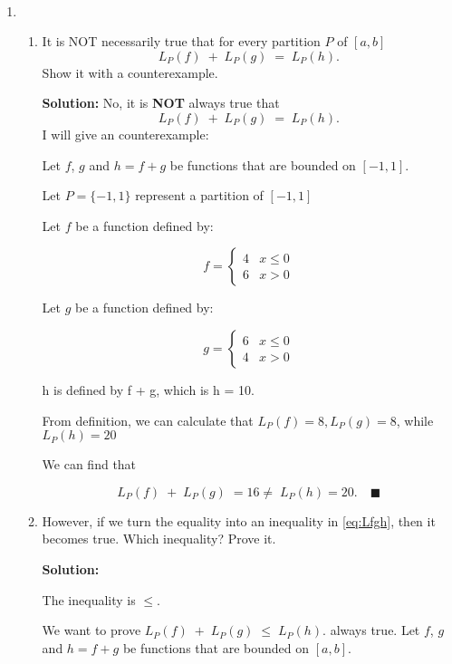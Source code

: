 \documentclass[12pt]{exam}
\begin{document}
\


\begin{enumerate}

\item  \begin{enumerate}
	\item It is NOT necessarily true that for every partition $P$ of $[a,b]$
		\begin{equation} \label{eq:Lfgh}
			L_{P}(f) \; + \; L_P(g) \; = \; L_P(h).
		\end{equation}
	Show it with a counterexample.
	
	\textbf{Solution:}
		No, it is \textbf{NOT} always true that
	$$
			L_{P}(f) \; + \; L_P(g) \; = \; L_P(h).
	$$
	I will give an counterexample:
	
	Let $f$, $g$ and $h=f+g$ be functions that are bounded on $[-1,1]$.
	
	Let $P=\{-1, 1\}$ represent a partition of $[-1,1]$
	
	Let $f$ be a function defined by:
	
	\[
	    f = 
	    \begin{cases}
	        4 & x \leq 0 \\
	        6 & x > 0
	    \end{cases}
	\]
	
	Let $g$ be a function defined by:
	
	\[
	    g = 
	    \begin{cases}
	        6 & x \leq 0 \\
	        4 & x > 0
	    \end{cases}
	\]
	
	h is defined by f + g, which is h = 10.
	
	From definition, we can calculate that $L_{P}(f) = 8, L_{P}(g) = 8$, while $L_{P}(h) = 20$
	
	We can find that 
	
	$$
	    L_{P}(f) \; + \; L_P(g) \; =  16 \neq \; L_P(h) = 20.\quad\blacksquare
	$$
	
	\item 	However, if we turn the equality into an inequality in \eqref{eq:Lfgh}, then it becomes true.  Which inequality?  Prove it.
	
	\textbf{Solution:}
	
	The inequality is $\leq$.
	
	We want to prove $L_{P}(f) \; + \; L_{P}(g) \; \leq \; L_{P}(h).$ always true. Let $f$, $g$ and $h=f+g$ be functions that are bounded on $[a,b]$.
	

\end{enumerate}
\end{enumerate}
\end{document}
